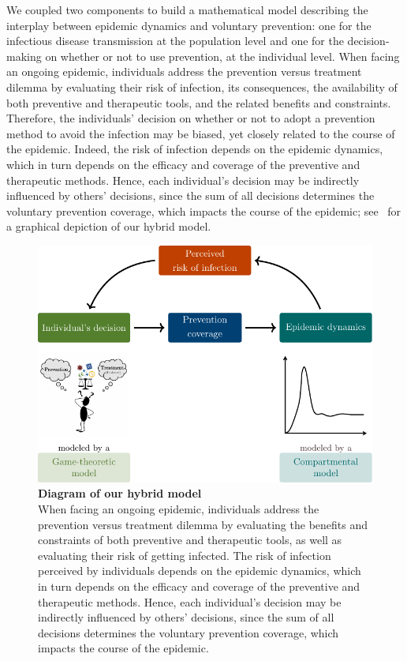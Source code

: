 We coupled two components to build a mathematical model describing the interplay between epidemic dynamics and voluntary prevention: one for the infectious disease transmission at the population level and one for the decision-making on whether or not to use prevention, at the individual level. When facing an ongoing epidemic, individuals address the prevention versus treatment dilemma by evaluating their risk of infection, its consequences, the availability of both preventive and therapeutic tools, and the related benefits and constraints. Therefore, the individuals' decision on whether or not to adopt a prevention method to avoid the infection may be biased, yet closely related to the course of the epidemic. Indeed, the risk of infection depends on the epidemic dynamics, which in turn depends on the efficacy and coverage of the preventive and therapeutic methods. Hence, each individual's decision may be indirectly influenced by others' decisions, since the sum of all decisions determines the voluntary prevention coverage, which impacts the course of the epidemic; see~ for a graphical depiction of our hybrid model. %

\begin{figure}[H]
	\centering	
	\includegraphics{Figures/Intro/TikZ_Model/ModelDiagram}
	\caption[Diagram of our hybrid model]{%
		{\bf Diagram of our hybrid model}\\
		When facing an ongoing epidemic, individuals address the prevention versus treatment dilemma by evaluating the benefits and constraints of both preventive and therapeutic tools, as well as evaluating their risk of getting infected. The risk of infection perceived by individuals depends on the epidemic dynamics, which in turn depends on the efficacy and coverage of the preventive and therapeutic methods. Hence, each individual's decision may be indirectly influenced by others' decisions, since the sum of all decisions determines the voluntary prevention coverage, which impacts the course of the epidemic.
	}
	\label{ModelDiagram}
\end{figure}

